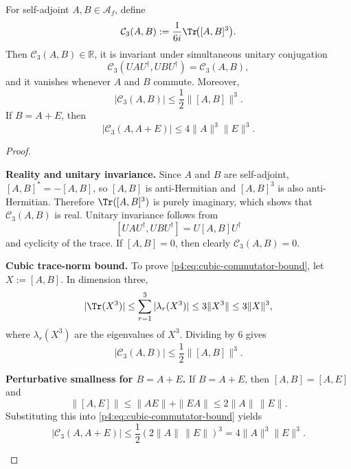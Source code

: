 \documentclass[12pt,a4paper]{article}
\begin{document}
\begin{proposition}
\label{p4:prop:cubic-commutator-invariant}
For self-adjoint $A,B\in\mathcal A_f$, define
\begin{equation}
\label{p4:eq:cubic-commutator-invariant}
\mathcal C_3(A,B):=\frac{1}{6i}\Tr\!\bigl([A,B]^3\bigr).
\end{equation}
Then $\mathcal C_3(A,B)\in\mathbb R$, it is invariant under simultaneous unitary conjugation
\[
\mathcal C_3(U A U^\dagger, U B U^\dagger)=\mathcal C_3(A,B),
\]
and it vanishes whenever $A$ and $B$ commute.
Moreover,
\begin{equation}
\label{p4:eq:cubic-commutator-bound}
|\mathcal C_3(A,B)|
\le
\frac12 \|[A,B]\|^3.
\end{equation}
If $B=A+E$, then
\begin{equation}
\label{p4:eq:cubic-commutator-perturbative-bound}
|\mathcal C_3(A,A+E)|
\le
4\|A\|^3\|E\|^3.
\end{equation}
\end{proposition}

\begin{proof}
\begin{proofsteps}

\item \textbf{Reality and unitary invariance.}
Since $A$ and $B$ are self-adjoint, $[A,B]^*=-[A,B]$, so $[A,B]$ is anti-Hermitian and $[A,B]^3$ is also anti-Hermitian.
Therefore $\Tr([A,B]^3)$ is purely imaginary, which shows that $\mathcal C_3(A,B)$ is real.
Unitary invariance follows from
\[
[UAU^\dagger,UBU^\dagger]=U[A,B]U^\dagger
\]
and cyclicity of the trace.
If $[A,B]=0$, then clearly $\mathcal C_3(A,B)=0$.


\item \textbf{Cubic trace-norm bound.}
To prove \eqref{p4:eq:cubic-commutator-bound}, let $X:=[A,B]$.
In dimension three,
\[
|\Tr(X^3)|\le \sum_{r=1}^3 |\lambda_r(X^3)| \le 3\|X^3\| \le 3\|X\|^3,
\]
where $\lambda_r(X^3)$ are the eigenvalues of $X^3$.
Dividing by $6$ gives
\[
|\mathcal C_3(A,B)|\le \frac12 \|[A,B]\|^3.
\]


\item \textbf{Perturbative smallness for \(B=A+E\).}
If $B=A+E$, then $[A,B]=[A,E]$ and
\[
\|[A,E]\|
\le
\|AE\|+\|EA\|
\le
2\|A\|\,\|E\|.
\]
Substituting this into \eqref{p4:eq:cubic-commutator-bound} yields
\[
|\mathcal C_3(A,A+E)|
\le
\frac12 (2\|A\|\,\|E\|)^3
=
4\|A\|^3\|E\|^3.
\]
\end{proofsteps}

\end{proof}
\end{document}
